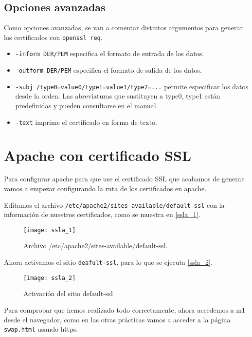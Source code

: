 \section{Opciones avanzadas}

Como opciones avanzadas, se van a comentar distintos argumentos para generar los certificados con \verb|openssl req|.

\begin{itemize}
\item \verb|-inform DER/PEM| especifica el formato de entrada de los datos.
\item \verb|-outform DER/PEM| especifica el formato de salida de los datos.
\item \verb|-subj /type0=value0/type1=value1/type2=...| permite especificar los datos desde la orden. Las abreviaturas que sustituyen a type0, type1 están predefinidas y pueden consultarse en el manual.
\item \verb|-text| imprime el certificado en forma de texto.
\end{itemize}


\chapter{Apache con certificado SSL}

Para configurar apache para que use el certificado SSL que acabamos de generar vamos a empezar configurando la ruta de los certificados en apache.

Editamos el archivo \verb|/etc/apache2/sites-available/default-ssl| con la información de nuestros certificados, como se muestra en \eqref{ssla_1}.

\begin{figure}[h!]
\begin{center}
\caption{Archivo /etc/apache2/sites-available/default-ssl.}
\label{ssla_1}
\texttt{[image: ssla\_1]}
\end{center}
\end{figure}

Ahora activamos el sitio \verb|deafult-ssl|, para lo que se ejecuta \eqref{ssla_2}.

\begin{figure}[h!]
\begin{center}
\caption{Activación del sitio default-ssl}
\label{ssla_2}
\texttt{[image: ssla\_2]}
\end{center}
\end{figure}

Para comprobar que hemos realizado todo correctamente, ahora accedemos a m1 desde el navegador, como en las otras prácticas vamos a acceder a la página \verb|swap.html| usando https.

